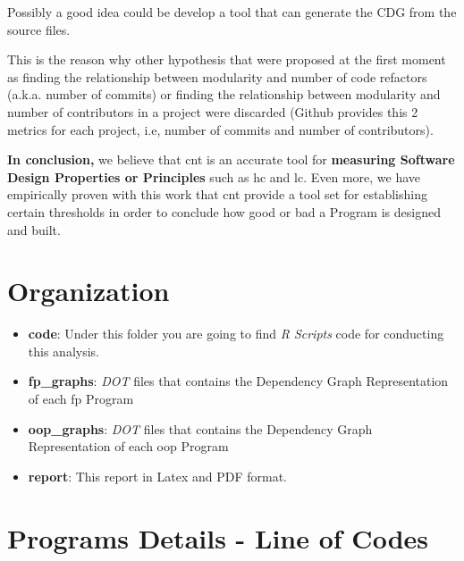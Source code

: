 \documentclass[12pt, a4paper]{article}
\begin{document}
Possibly a good idea could be develop a tool that can generate the CDG from the source files.

This is the reason why other hypothesis that were proposed at the first moment as finding the relationship between modularity and number of code refactors (a.k.a. number of commits) or finding the relationship between modularity and number of contributors in a project were discarded (Github provides this 2 metrics for each project, i.e, number of commits and number of contributors).

\textbf{In conclusion,} we believe that \acrfull{cnt} is an accurate tool for \textbf{measuring Software Design Properties or Principles} such as \acrlong{hc} and \acrlong{lc}. 
Even more, we have empirically proven with this work that \acrlong{cnt} provide a tool set for establishing certain thresholds in order to conclude how good or bad a Program is designed and built. 




\appendix
\section{Organization}\label{apx:sec:org:1}

\begin{itemize}
    \item \textbf{code}: Under this folder you are going to find \textit{R Scripts} code for conducting this analysis.
    \item \textbf{fp\_graphs}: \textit{DOT} files that contains the Dependency Graph Representation of each \acrlong{fp} Program
    \item \textbf{oop\_graphs}: \textit{DOT} files that contains the Dependency Graph Representation of each \acrlong{oop} Program
    \item \textbf{report}: This report in Latex and PDF format.
\end{itemize}

\section{Programs Details - Line of Codes}\label{apx:sec:loc}
\end{document}
